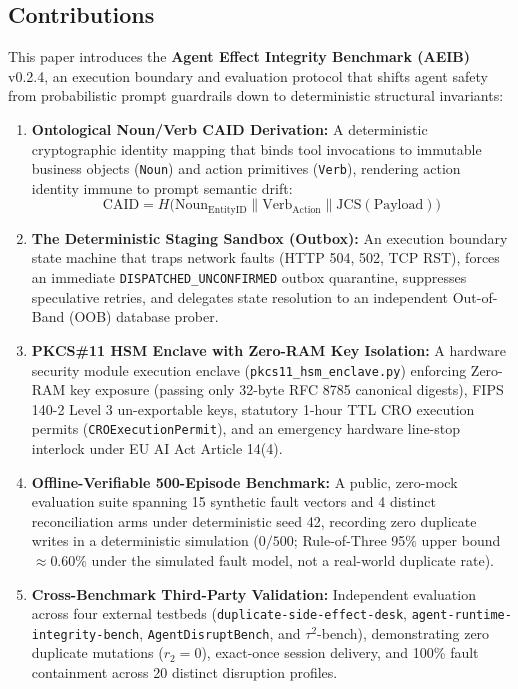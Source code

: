 \documentclass[10pt,journal,compsoc]{IEEEtran}
\begin{document}
\subsection{Contributions}
This paper introduces the \textbf{Agent Effect Integrity Benchmark (AEIB)} v0.2.4, an execution boundary and evaluation protocol that shifts agent safety from probabilistic prompt guardrails down to deterministic structural invariants:
\begin{enumerate}
    \item \textbf{Ontological Noun/Verb CAID Derivation:} A deterministic cryptographic identity mapping that binds tool invocations to immutable business objects (\texttt{Noun}) and action primitives (\texttt{Verb}), rendering action identity immune to prompt semantic drift:
    \begin{equation}
    \text{CAID} = H\Big(\text{Noun}_{\text{EntityID}} \parallel \text{Verb}_{\text{Action}} \parallel \text{JCS}(\text{Payload})\Big)
    \end{equation}
    \item \textbf{The Deterministic Staging Sandbox (Outbox):} An execution boundary state machine that traps network faults (HTTP 504, 502, TCP RST), forces an immediate \texttt{DISPATCHED\_UNCONFIRMED} outbox quarantine, suppresses speculative retries, and delegates state resolution to an independent Out-of-Band (OOB) database prober.
    \item \textbf{PKCS\#11 HSM Enclave with Zero-RAM Key Isolation:} A hardware security module execution enclave (\texttt{pkcs11\_hsm\_enclave.py}) enforcing Zero-RAM key exposure (passing only 32-byte RFC 8785 canonical digests), FIPS 140-2 Level 3 un-exportable keys, statutory 1-hour TTL CRO execution permits (\texttt{CROExecutionPermit}), and an emergency hardware line-stop interlock under EU AI Act Article 14(4).
    \item \textbf{Offline-Verifiable 500-Episode Benchmark:} A public, zero-mock evaluation suite spanning 15 synthetic fault vectors and 4 distinct reconciliation arms under deterministic seed 42, recording zero duplicate writes in a deterministic simulation ($0/500$; Rule-of-Three 95\% upper bound $\approx 0.60\%$ under the simulated fault model, not a real-world duplicate rate).
    \item \textbf{Cross-Benchmark Third-Party Validation:} Independent evaluation across four external testbeds (\texttt{duplicate-side-effect-desk}, \texttt{agent-runtime-integrity-bench}, \texttt{AgentDisruptBench}, and $\tau^2$-bench), demonstrating zero duplicate mutations ($r_2 = 0$), exact-once session delivery, and 100\% fault containment across 20 distinct disruption profiles.
\end{enumerate}
\end{document}

